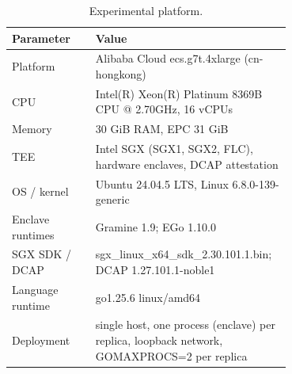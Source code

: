 \begin{table}[t]
\centering
\small
\caption{Experimental platform.}
\label{tab:platform}
\begin{tabular}{lp{0.7\linewidth}}
\toprule
Parameter & Value \\
\midrule
Platform & Alibaba Cloud ecs.g7t.4xlarge (cn-hongkong) \\
CPU & Intel(R) Xeon(R) Platinum 8369B CPU @ 2.70GHz, 16 vCPUs \\
Memory & 30 GiB RAM, EPC 31 GiB \\
TEE & Intel SGX (SGX1, SGX2, FLC), hardware enclaves, DCAP attestation \\
OS / kernel & Ubuntu 24.04.5 LTS, Linux 6.8.0-139-generic \\
Enclave runtimes & Gramine 1.9; EGo 1.10.0 \\
SGX SDK / DCAP & sgx\_linux\_x64\_sdk\_2.30.101.1.bin; DCAP 1.27.101.1-noble1 \\
Language runtime & go1.25.6 linux/amd64 \\
Deployment & single host, one process (enclave) per replica, loopback network, GOMAXPROCS=2 per replica \\
\bottomrule
\end{tabular}
\end{table}
